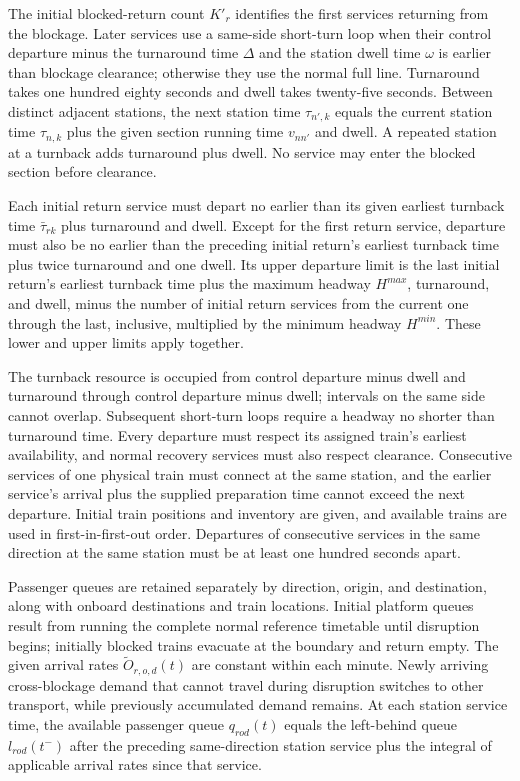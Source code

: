 \documentclass[10pt]{article}
\begin{document}
The initial blocked-return count $K'_r$ identifies the first services returning from the blockage. Later services use a same-side short-turn loop when their control departure minus the turnaround time $\Delta$ and the station dwell time $\omega$ is earlier than blockage clearance; otherwise they use the normal full line. Turnaround takes one hundred eighty seconds and dwell takes twenty-five seconds. Between distinct adjacent stations, the next station time $\tau_{n',k}$ equals the current station time $\tau_{n,k}$ plus the given section running time $v_{nn'}$ and dwell. A repeated station at a turnback adds turnaround plus dwell. No service may enter the blocked section before clearance.

Each initial return service must depart no earlier than its given earliest turnback time $\bar\tau_{rk}$ plus turnaround and dwell. Except for the first return service, departure must also be no earlier than the preceding initial return's earliest turnback time plus twice turnaround and one dwell. Its upper departure limit is the last initial return's earliest turnback time plus the maximum headway $H^{max}$, turnaround, and dwell, minus the number of initial return services from the current one through the last, inclusive, multiplied by the minimum headway $H^{min}$. These lower and upper limits apply together.

The turnback resource is occupied from control departure minus dwell and turnaround through control departure minus dwell; intervals on the same side cannot overlap. Subsequent short-turn loops require a headway no shorter than turnaround time. Every departure must respect its assigned train's earliest availability, and normal recovery services must also respect clearance. Consecutive services of one physical train must connect at the same station, and the earlier service's arrival plus the supplied preparation time cannot exceed the next departure. Initial train positions and inventory are given, and available trains are used in first-in-first-out order. Departures of consecutive services in the same direction at the same station must be at least one hundred seconds apart.

Passenger queues are retained separately by direction, origin, and destination, along with onboard destinations and train locations. Initial platform queues result from running the complete normal reference timetable until disruption begins; initially blocked trains evacuate at the boundary and return empty. The given arrival rates $\widetilde O_{r,o,d}(t)$ are constant within each minute. Newly arriving cross-blockage demand that cannot travel during disruption switches to other transport, while previously accumulated demand remains. At each station service time, the available passenger queue $q_{rod}(t)$ equals the left-behind queue $l_{rod}(t^-)$ after the preceding same-direction station service plus the integral of applicable arrival rates since that service.
\end{document}
